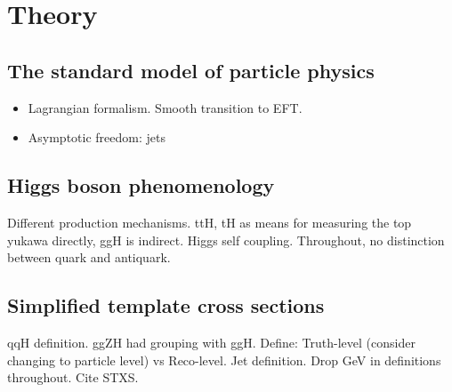 \chapter{Theory}
\label{chap:theory}

\section{The standard model of particle physics}
\begin{itemize}
    \item Lagrangian formalism. Smooth transition to EFT.
    \item Asymptotic freedom: jets
\end{itemize}

\section{Higgs boson phenomenology}
Different production mechanisms. ttH, tH as means for measuring the top yukawa directly, ggH is indirect. Higgs self coupling. Throughout, no distinction between quark and antiquark.

\section{Simplified template cross sections}\label{sec:theory_stxs}
qqH definition. ggZH had grouping with ggH. Define: Truth-level (consider changing to particle level) vs Reco-level. Jet definition. Drop GeV in definitions throughout. Cite STXS.

